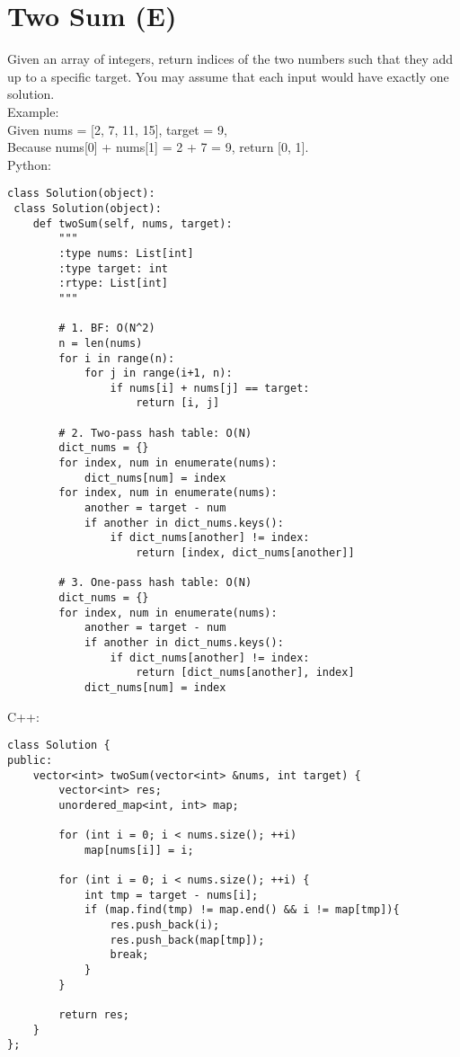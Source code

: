 \section{Two Sum (E)}
Given an array of integers, return indices of the two numbers such that they add up to a specific target. You may assume that each input would have exactly one solution. \\

Example:\\
Given nums = [2, 7, 11, 15], target = 9,\\
Because nums[0] + nums[1] = 2 + 7 = 9, return [0, 1].\\

Python:
\lstset{language=python}
\begin{lstlisting}
class Solution(object):
 class Solution(object):
    def twoSum(self, nums, target):
        """
        :type nums: List[int]
        :type target: int
        :rtype: List[int]
        """
        
        # 1. BF: O(N^2)
        n = len(nums)
        for i in range(n):
            for j in range(i+1, n):
                if nums[i] + nums[j] == target:
                    return [i, j]
        
        # 2. Two-pass hash table: O(N)
        dict_nums = {}
        for index, num in enumerate(nums):
            dict_nums[num] = index
        for index, num in enumerate(nums):
            another = target - num
            if another in dict_nums.keys():
                if dict_nums[another] != index:
                    return [index, dict_nums[another]]
            
        # 3. One-pass hash table: O(N)
        dict_nums = {}
        for index, num in enumerate(nums):
            another = target - num
            if another in dict_nums.keys():
                if dict_nums[another] != index:
                    return [dict_nums[another], index]
            dict_nums[num] = index
\end{lstlisting}


C++:
\lstset{language=C++}
\begin{lstlisting}
class Solution {
public:
    vector<int> twoSum(vector<int> &nums, int target) {
        vector<int> res;
        unordered_map<int, int> map;
        
        for (int i = 0; i < nums.size(); ++i)
            map[nums[i]] = i;
            
        for (int i = 0; i < nums.size(); ++i) {
            int tmp = target - nums[i];
            if (map.find(tmp) != map.end() && i != map[tmp]){
                res.push_back(i);
                res.push_back(map[tmp]);
                break;
            }
        }
        
        return res;
    }
};
\end{lstlisting}


